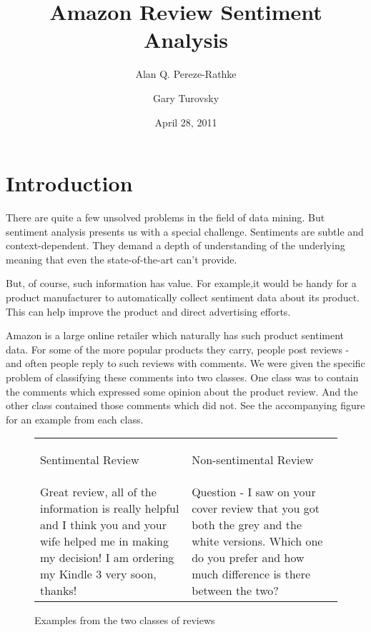 \documentclass[]{report}
\begin{document}
\title{Amazon Review Sentiment Analysis} 
\author{Alan Q. Pereze-Rathke \and Gary Turovsky}
\date{April 28, 2011}   
\maketitle


\section{Introduction} 
There are quite a few unsolved problems in the field of data mining.  But sentiment analysis presents us with a special challenge.  Sentiments are subtle and context-dependent.  They demand a depth of understanding of the underlying meaning that even the state-of-the-art can't provide.

But, of course, such information has value. For example,it would be handy for a product manufacturer to automatically collect sentiment data about its product.  This can help improve the product and direct advertising efforts.

Amazon is a large online retailer which naturally has such product sentiment data.  For some of the more popular products they carry, people post reviews - and often people reply to such reviews with comments.  We were given the specific problem of classifying these comments into two classes.  One class was to contain the comments which expressed some opinion about the product review.  And the other class contained those comments which did not.  See the accompanying figure for an example from each class.


\begin{figure}[h]
	\begin{center}
		\begin{tabular}{ p{5 cm}  p{5 cm} }
			\begin{center}Sentimental Review\end{center} & 
			\begin{center}Non-sentimental Review\end{center}\\
			Great review, all of the information is really helpful and I think you and your wife helped me in making my decision! I am ordering my Kindle 3 very soon, thanks!
			& 
			Question - I saw on your cover review that you got both the grey and the white versions. Which one do you prefer and how much difference is there between the two?  \\
		\end{tabular}
	\end{center}
	\caption{Examples from the two classes of reviews}
	\label{figExampleReviews}
\end{figure}
\end{document}
